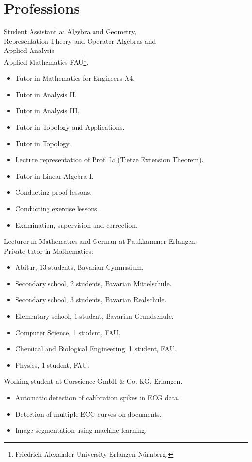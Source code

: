 \documentclass[a4paper, 11pt]{article}
\newcommand{\years}[1]{\marginnote{\scriptsize #1}}
\begin{document}
\section*{Professions}
\years{2023--25} Student Assistant at Algebra and Geometry, \\
Representation Theory and Operator Algebras and \\
Applied Analysis \\
Applied Mathematics FAU\footnote{Friedrich-Alexander University Erlangen-Nürnberg.}.
\begin{itemize}
	\item Tutor in \glqq Mathematics for Engineers A4\grqq.
	\item Tutor in \glqq Analysis II\grqq.
	\item Tutor in \glqq Analysis III\grqq.
	\item Tutor in \glqq Topology and Applications\grqq.
	\item Tutor in \glqq Topology\grqq.
	\item Lecture representation of Prof. Li (Tietze Extension Theorem).
	\item Tutor in \glqq Linear Algebra I\grqq.
	\item Conducting proof lessons.
	\item Conducting exercise lessons.
	\item Examination, supervision and correction.
\end{itemize}
\years{2025} Lecturer in Mathematics and German at Paukkammer Erlangen.\\
\years{2024--25} Private tutor in Mathematics:
\begin{itemize}
	\item Abitur, 13 students, Bavarian Gymnasium.
	\item Secondary school, 2 students, Bavarian Mittelschule.
	\item Secondary school, 3 students, Bavarian Realschule.
	\item Elementary school, 1 student, Bavarian Grundschule.
	\item Computer Science, 1 student, FAU. 
	\item Chemical and Biological Engineering, 1 student, FAU. 
	\item Physics, 1 student, FAU. 
\end{itemize}
\years{2021--22} Working student at Corscience GmbH \& Co. KG, Erlangen.
\begin{itemize}
	\item Automatic detection of calibration spikes in ECG data.
	\item Detection of multiple ECG curves on documents.
	\item Image segmentation using machine learning.
\end{itemize}
\end{document}
